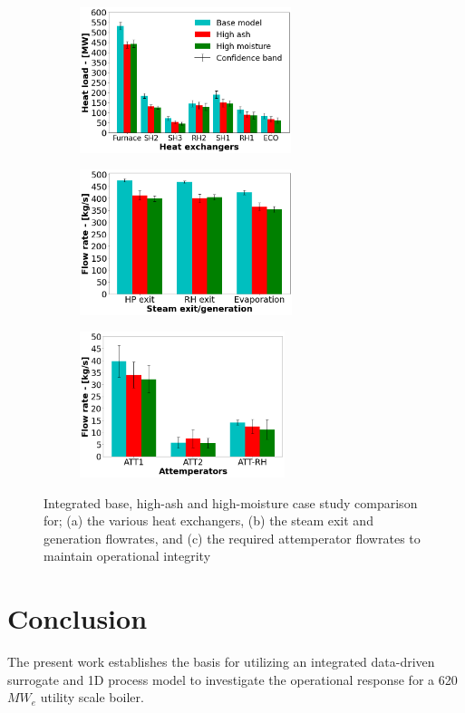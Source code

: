 \documentclass[a4paper,fleqn]{cas-dc}
\begin{document}
\begin{figure}
\centering
\begin{subfigure}{0.33\textwidth}
    \includegraphics[width=\textwidth, height = 4.25cm]{100_FUEL_CASE}
    \caption{}
\end{subfigure}\hfill %
\begin{subfigure}{0.33\textwidth}
    \includegraphics[width=\linewidth, height = 4.25cm]{100_FUEL_CASE_STEAM}
    \caption{}
\end{subfigure}\hfill
\begin{subfigure}{0.33\textwidth}
    \includegraphics[width=\linewidth, height = 4.25cm]{100_FUEL_CASE_ATTEMP}
    \caption{}
\end{subfigure}
\caption{Integrated base, high-ash and high-moisture case study comparison for; (a) the various heat exchangers, (b) the steam exit and generation flowrates, and (c) the required attemperator flowrates to maintain operational integrity}
\label{fig_fuel_results}
\end{figure}

\section{Conclusion}
The present work establishes the basis for utilizing an integrated data-driven surrogate and 1D process model to investigate the operational response for a 620 $MW_e$ utility scale boiler.\\
\end{document}
